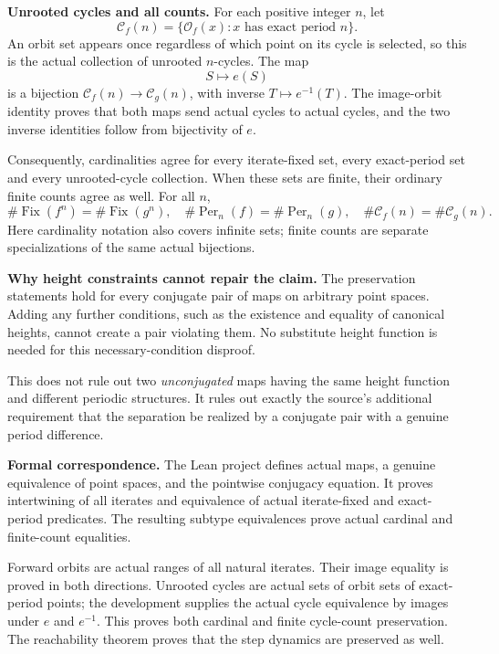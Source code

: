 \documentclass[11pt]{article}
\begin{document}
\newpage
\noindent\textbf{Unrooted cycles and all counts.}
For each positive integer $n$, let
\[
 \mathcal C_f(n)
 =\{\mathcal O_f(x):x\text{ has exact period }n\}.
\]
An orbit set appears once regardless of which point on its cycle is selected, so this is the actual collection of unrooted $n$-cycles. The map
\[
 S\longmapsto e(S)
\]
is a bijection $\mathcal C_f(n)\to\mathcal C_g(n)$, with inverse
$T\mapsto e^{-1}(T)$. The image-orbit identity proves that both maps send actual cycles to actual cycles, and the two inverse identities follow from bijectivity of $e$.

Consequently, cardinalities agree for every iterate-fixed set, every exact-period set and every unrooted-cycle collection. When these sets are finite, their ordinary finite counts agree as well. For all $n$,
\[
 \#\operatorname{Fix}(f^n)=\#\operatorname{Fix}(g^n),\quad
 \#\operatorname{Per}_n(f)=\#\operatorname{Per}_n(g),\quad
 \#\mathcal C_f(n)=\#\mathcal C_g(n).
\]
Here cardinality notation also covers infinite sets; finite counts are separate specializations of the same actual bijections.

\medskip
\noindent\textbf{Why height constraints cannot repair the claim.}
The preservation statements hold for every conjugate pair of maps on arbitrary point spaces. Adding any further conditions, such as the existence and equality of canonical heights, cannot create a pair violating them. No substitute height function is needed for this necessary-condition disproof.

This does not rule out two \emph{unconjugated} maps having the same height function and different periodic structures. It rules out exactly the source's additional requirement that the separation be realized by a conjugate pair with a genuine period difference.

\medskip
\noindent\textbf{Formal correspondence.}
The Lean project defines actual maps, a genuine equivalence of point spaces, and the pointwise conjugacy equation. It proves intertwining of all iterates and equivalence of actual iterate-fixed and exact-period predicates. The resulting subtype equivalences prove actual cardinal and finite-count equalities.

Forward orbits are actual ranges of all natural iterates. Their image equality is proved in both directions. Unrooted cycles are actual sets of orbit sets of exact-period points; the development supplies the actual cycle equivalence by images under $e$ and $e^{-1}$. This proves both cardinal and finite cycle-count preservation. The reachability theorem proves that the step dynamics are preserved as well.
\end{document}
